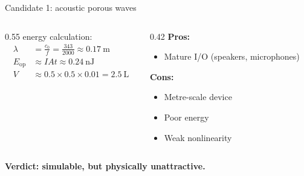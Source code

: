 \documentclass[aspectratio=169,11pt]{beamer}
\begin{document}
\begin{frame}{Candidate 1: acoustic porous waves}

\begin{columns}
\begin{column}{0.55\textwidth}
energy calculation:
\begin{align*}
    \lambda &= \frac{c_0}{f} = \frac{343}{2000} \approx 0.17\ \text{m} \\[0.3em]
    E_{\text{op}} &\approx I A t \approx 0.24\ \text{nJ} \\[0.3em]
    V &\approx 0.5 \times 0.5 \times 0.01 = 2.5\ \text{L}
\end{align*}
\end{column}
\begin{column}{0.42\textwidth}
\textbf{Pros:}
\begin{itemize}
    \item Mature I/O (speakers, microphones)
\end{itemize}

\vspace{0.3cm}
\textbf{Cons:}
\begin{itemize}
    \item Metre-scale device
    \item Poor energy
    \item Weak nonlinearity
\end{itemize}
\end{column}
\end{columns}

\vspace{0.4cm}
\centering
\textbf{Verdict: simulable, but physically unattractive.}

\end{frame}
\end{document}
